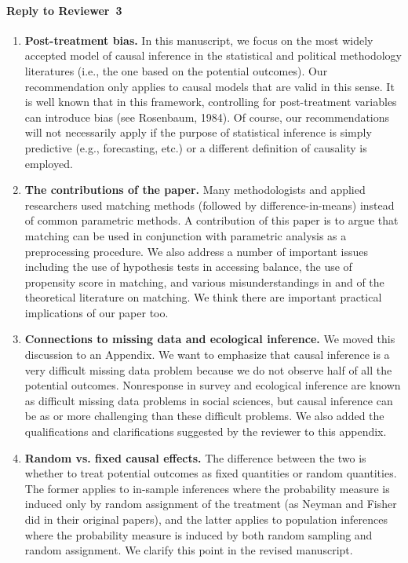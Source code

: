 \documentclass[11pt]{article}
\begin{document}

\paragraph{Reply to Reviewer~3}

\begin{enumerate}
  
\item {\bf Post-treatment bias.} In this manuscript, we focus on the
  most widely accepted model of causal inference in the statistical
  and political methodology literatures (i.e., the one based on the
  potential outcomes). Our recommendation only applies to causal
  models that are valid in this sense. It is well known that in this
  framework, controlling for post-treatment variables can introduce bias
  (see Rosenbaum, 1984).  Of course, our recommendations will not
  necessarily apply if the purpose of statistical inference is simply
  predictive (e.g., forecasting, etc.) or a different definition of
  causality is employed.
  
\item {\bf The contributions of the paper.} Many methodologists and
  applied researchers used matching methods (followed by
  difference-in-means) instead of common parametric methods. A
  contribution of this paper is to argue that matching can be used in
  conjunction with parametric analysis as a preprocessing procedure.
  We also address a number of important issues including the use of
  hypothesis tests in accessing balance, the use of propensity score
  in matching, and various misunderstandings in and of the theoretical
  literature on matching. We think there are important practical
  implications of our paper too.
  
\item {\bf Connections to missing data and ecological inference.} We
  moved this discussion to an Appendix. We want to emphasize that causal
  inference is a very difficult missing data problem because we do not
  observe half of all the potential outcomes. Nonresponse in survey
  and ecological inference are known as difficult missing data
  problems in social sciences, but causal inference can be as or more
  challenging than these difficult problems.  We also added the
  qualifications and clarifications suggested by the reviewer to this
  appendix.

\item {\bf Random vs. fixed causal effects.} The difference between
  the two is whether to treat potential outcomes as fixed quantities
  or random quantities. The former applies to in-sample inferences where
  the probability measure is induced only by random assignment of the
  treatment (as Neyman and Fisher did in their original papers), and
  the latter applies to population inferences where the probability
  measure is induced by both random sampling and random assignment. We
  clarify this point in the revised manuscript.
  

\end{enumerate}
\end{document}
